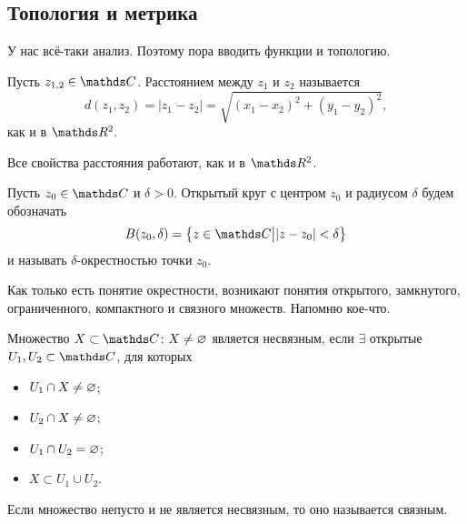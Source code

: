 \subsection{Топология и метрика}
У нас всё-таки анализ. Поэтому пора вводить функции и топологию.
\begin{Def}
	Пусть $z_{1,2}\in\C$. Расстоянием между $z_1$ и $z_2$ называется
	\[
	d(z_1,z_2) = |z_1-z_2| = \sqrt{(x_1-x_2)^2+(y_1-y_2)^2},
	\]
	как и в $\R^2$.
\end{Def}
Все свойства расстояния работают, как и в $\R^2$.
\begin{Def}
	Пусть $z_0\in\C$ и $\delta>0$. Открытый круг с центром $z_0$ и радиусом $\delta$ будем обозначать
	\[
		B(z_0,\delta) = \big\{z\in\C\big||z-z_0|<\delta\big\}
	\] и называть $\delta$-окрестностью точки $z_0$.
\end{Def}
Как только есть понятие окрестности, возникают понятия открытого, замкнутого, ограниченного, компактного и связного множеств. Напомню кое-что.
\begin{Def}
	Множество $X\subset\C\colon X\ne \q$ является несвязным, если $\exists$ открытые $U_1,U_2\subset\C$, для которых
	\begin{itemize}
		\item $U_1\cap X\ne\varnothing$;
		\item $U_2\cap X\ne \varnothing$;
		\item $U_1\cap U_2 = \varnothing$;
		\item $X\subset U_1\cup U_2$.
	\end{itemize}

	Если множество непусто и не является несвязным, то оно называется связным.
\end{Def}

